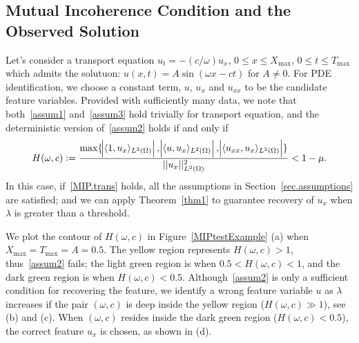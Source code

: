 \documentclass[a4paper,11pt]{article}
\theoremstyle{definition}
\begin{document}
\subsection{Mutual Incoherence Condition and the Observed Solution}
Let's consider a transport equation $u_t=-(c/\omega)u_x$, $0\leq x\leq X_{\max}$, $0\leq t\leq T_{\max}$ which admits the solutuon: $u(x,t)=A\sin(\omega x-ct)$ for $A\neq 0$. For PDE identification, we choose a constant term, $u$, $u_x$ and $u_{xx}$ to be the candidate feature variables.
%
Provided with sufficiently many data, we note that both~\eqref{assum1} and~\eqref{assum3} hold trivially for transport equation, and the deterministic version of~\eqref{assum2}  holds if and only if
\begin{align}
H(\omega,c):=\frac{\max\{\abs{\langle 1,u_x\rangle_{L^2(\Omega)}},\abs{\langle u,u_x\rangle_{L^2(\Omega)}},\abs{\langle u_{xx},u_x\rangle_{L^2(\Omega)}}\}}{||u_x||^2_{L^2(\Omega)}}<1-\mu.	\label{MIP.trans}
\end{align}
In this case, if~\eqref{MIP.trans} holds, all the assumptions in Section~\ref{sec.assumptions} are satisfied; and we can apply Theorem~\ref{thm1} to guarantee recovery of $u_x$ when $\lambda$ is greater than a threshold.

We plot the contour of $H(\omega,c)$ in Figure~\ref{MIPtestExample} (a) when $X_{\max}=T_{\max}=A=0.5$. The yellow region represents $H(\omega,c)>1$, thus~\eqref{assum2} fails;  the light green region is when  $0.5<H(\omega,c)<1$, and the dark green region is when $H(\omega,c)<0.5$.  Although~\eqref{assum2} is only a sufficient condition for recovering the feature,  we identify a wrong feature variable $u$ as $\lambda$ increases if the pair $(\omega,c)$ is deep inside the yellow region ($H(\omega,c)\gg 1$), see (b) and (c). When $(\omega,c)$ resides inside the dark green region ($H(\omega,c)<0.5$), the correct feature $u_x$ is chosen, as shown in (d).
\end{document}
